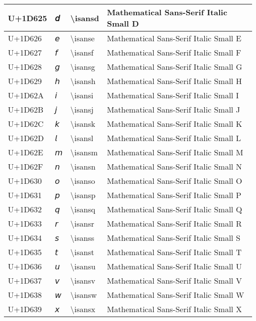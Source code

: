 \begin{table}[h]
\begin{tabulary}{\linewidth}{|L|L|L|L|}
U+1D625 & 𝘥 & {\textbackslash}isansd & Mathematical Sans-Serif Italic Small D \\
\hline
U+1D626 & 𝘦 & {\textbackslash}isanse & Mathematical Sans-Serif Italic Small E \\
\hline
U+1D627 & 𝘧 & {\textbackslash}isansf & Mathematical Sans-Serif Italic Small F \\
\hline
U+1D628 & 𝘨 & {\textbackslash}isansg & Mathematical Sans-Serif Italic Small G \\
\hline
U+1D629 & 𝘩 & {\textbackslash}isansh & Mathematical Sans-Serif Italic Small H \\
\hline
U+1D62A & 𝘪 & {\textbackslash}isansi & Mathematical Sans-Serif Italic Small I \\
\hline
U+1D62B & 𝘫 & {\textbackslash}isansj & Mathematical Sans-Serif Italic Small J \\
\hline
U+1D62C & 𝘬 & {\textbackslash}isansk & Mathematical Sans-Serif Italic Small K \\
\hline
U+1D62D & 𝘭 & {\textbackslash}isansl & Mathematical Sans-Serif Italic Small L \\
\hline
U+1D62E & 𝘮 & {\textbackslash}isansm & Mathematical Sans-Serif Italic Small M \\
\hline
U+1D62F & 𝘯 & {\textbackslash}isansn & Mathematical Sans-Serif Italic Small N \\
\hline
U+1D630 & 𝘰 & {\textbackslash}isanso & Mathematical Sans-Serif Italic Small O \\
\hline
U+1D631 & 𝘱 & {\textbackslash}isansp & Mathematical Sans-Serif Italic Small P \\
\hline
U+1D632 & 𝘲 & {\textbackslash}isansq & Mathematical Sans-Serif Italic Small Q \\
\hline
U+1D633 & 𝘳 & {\textbackslash}isansr & Mathematical Sans-Serif Italic Small R \\
\hline
U+1D634 & 𝘴 & {\textbackslash}isanss & Mathematical Sans-Serif Italic Small S \\
\hline
U+1D635 & 𝘵 & {\textbackslash}isanst & Mathematical Sans-Serif Italic Small T \\
\hline
U+1D636 & 𝘶 & {\textbackslash}isansu & Mathematical Sans-Serif Italic Small U \\
\hline
U+1D637 & 𝘷 & {\textbackslash}isansv & Mathematical Sans-Serif Italic Small V \\
\hline
U+1D638 & 𝘸 & {\textbackslash}isansw & Mathematical Sans-Serif Italic Small W \\
\hline
U+1D639 & 𝘹 & {\textbackslash}isansx & Mathematical Sans-Serif Italic Small X \\

\end{tabulary}
\end{table}
